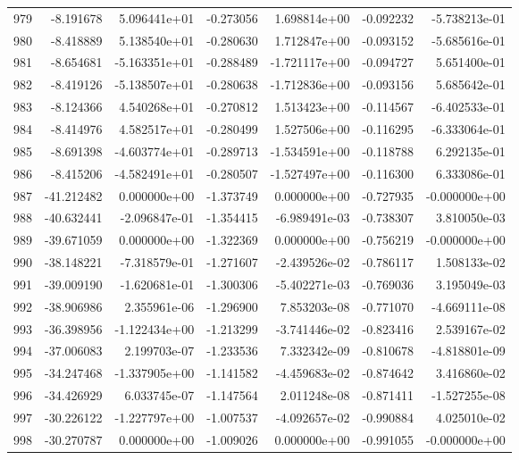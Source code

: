 \begin{tabular}{rrrrrrr}
 979 &  -8.191678 &  5.096441e+01 & -0.273056 &  1.698814e+00 &   -0.092232 & -5.738213e-01 \\
 980 &  -8.418889 &  5.138540e+01 & -0.280630 &  1.712847e+00 &   -0.093152 & -5.685616e-01 \\
 981 &  -8.654681 & -5.163351e+01 & -0.288489 & -1.721117e+00 &   -0.094727 &  5.651400e-01 \\
 982 &  -8.419126 & -5.138507e+01 & -0.280638 & -1.712836e+00 &   -0.093156 &  5.685642e-01 \\
 983 &  -8.124366 &  4.540268e+01 & -0.270812 &  1.513423e+00 &   -0.114567 & -6.402533e-01 \\
 984 &  -8.414976 &  4.582517e+01 & -0.280499 &  1.527506e+00 &   -0.116295 & -6.333064e-01 \\
 985 &  -8.691398 & -4.603774e+01 & -0.289713 & -1.534591e+00 &   -0.118788 &  6.292135e-01 \\
 986 &  -8.415206 & -4.582491e+01 & -0.280507 & -1.527497e+00 &   -0.116300 &  6.333086e-01 \\
 987 & -41.212482 &  0.000000e+00 & -1.373749 &  0.000000e+00 &   -0.727935 & -0.000000e+00 \\
 988 & -40.632441 & -2.096847e-01 & -1.354415 & -6.989491e-03 &   -0.738307 &  3.810050e-03 \\
 989 & -39.671059 &  0.000000e+00 & -1.322369 &  0.000000e+00 &   -0.756219 & -0.000000e+00 \\
 990 & -38.148221 & -7.318579e-01 & -1.271607 & -2.439526e-02 &   -0.786117 &  1.508133e-02 \\
 991 & -39.009190 & -1.620681e-01 & -1.300306 & -5.402271e-03 &   -0.769036 &  3.195049e-03 \\
 992 & -38.906986 &  2.355961e-06 & -1.296900 &  7.853203e-08 &   -0.771070 & -4.669111e-08 \\
 993 & -36.398956 & -1.122434e+00 & -1.213299 & -3.741446e-02 &   -0.823416 &  2.539167e-02 \\
 994 & -37.006083 &  2.199703e-07 & -1.233536 &  7.332342e-09 &   -0.810678 & -4.818801e-09 \\
 995 & -34.247468 & -1.337905e+00 & -1.141582 & -4.459683e-02 &   -0.874642 &  3.416860e-02 \\
 996 & -34.426929 &  6.033745e-07 & -1.147564 &  2.011248e-08 &   -0.871411 & -1.527255e-08 \\
 997 & -30.226122 & -1.227797e+00 & -1.007537 & -4.092657e-02 &   -0.990884 &  4.025010e-02 \\
 998 & -30.270787 &  0.000000e+00 & -1.009026 &  0.000000e+00 &   -0.991055 & -0.000000e+00 \\

\end{tabular}
